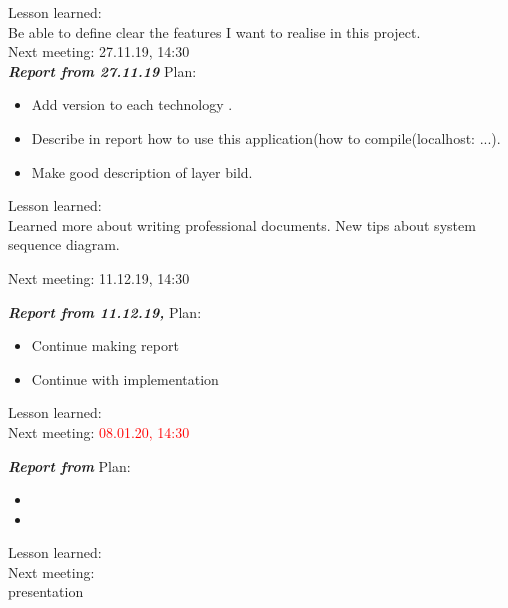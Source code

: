 \documentclass{scrartcl}
\begin{document}
Lesson learned:\\
Be able to define clear the features I want to realise in this project.\\
Next meeting: {27.11.19, 14:30} \\




\textbf{\textit{Report from 27.11.19}}
Plan:\\
\begin{itemize}
	\item	Add version to each technology .

	\item	Describe in report how to use this application(how to compile(localhost: ...).
	\item Make good description of layer bild.

\end{itemize}

Lesson learned:\\ Learned more about writing professional documents. New tips about system sequence diagram.

Next meeting: {11.12.19, 14:30}


\textbf{\textit{Report from 11.12.19, }}
Plan:\\
\begin{itemize}
	\item	 Continue making report 
	
	\item	Continue with implementation

\end{itemize}

Lesson learned:\\

Next meeting: \textcolor{red}{08.01.20, 14:30}


\textbf{\textit{Report from }}
Plan:\\
\begin{itemize}
	\item	 

	\item	

\end{itemize}

Lesson learned:\\

Next meeting: \\ {presentation}
\end{document}
